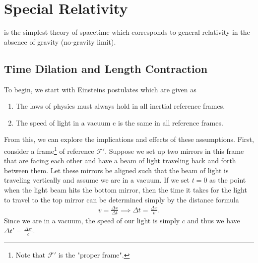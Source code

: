 \section{Special Relativity}

 is the simplest theory of spacetime which corresponds to general relativity in the absence of gravity (no-gravity limit).

\subsection{Time Dilation and Length Contraction}
To begin, we start with Einsteins postulates which are given as
\begin{enumerate}
	\item The laws of physics must always hold in all inertial reference frames.
	\item The speed of light in a vacuum c is the same in all reference frames.
\end{enumerate}
From this, we can explore the implications and effects of these assumptions. First, consider a frame\footnote{Note that $\mathcal{F}'$ is the "proper frame".} of reference $\mathcal{F}'$. Suppose we set up two mirrors in this frame that are facing each other and have a beam of light traveling back and forth between them. Let these mirrors be aligned such that the beam of light is traveling vertically and assume we are in a vacuum. If we set $t=0$ as the point when the light beam hits the bottom mirror, then the time it takes for the light to travel to the top mirror can be determined simply by the distance formula \begin{align}
	v=\frac{\Delta x}{\Delta t} \implies \Delta t = \frac{\Delta x}{v}. \label{v=d/t}
\end{align} 
Since we are in a vacuum, the speed of our light is simply $c$ and thus we have $\Delta t' = \frac{\Delta x'}{c}$. 

